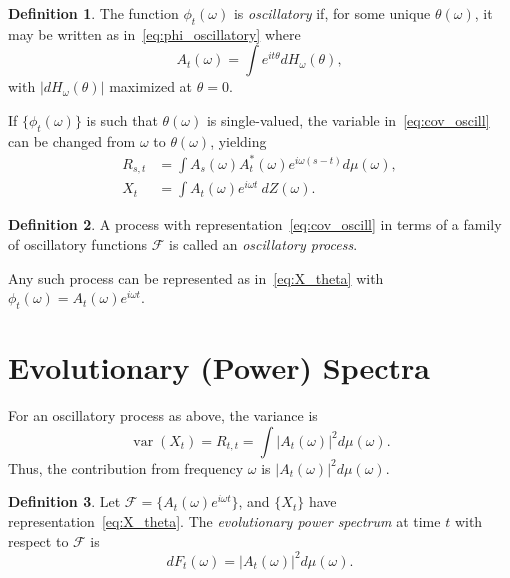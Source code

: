 \documentclass[12pt]{article}
\theoremstyle{definition}
\newtheorem{definition}{Definition}[section]
\theoremstyle{plain}
\theoremstyle{remark}
\begin{document}
\begin{definition}
\label{def:oscillatory_function}
The function $\phi_t(\omega)$ is \emph{oscillatory} if, for some unique $\theta(\omega)$, it may be written as in~\eqref{eq:phi_oscillatory} where
\begin{equation}
A_t(\omega) = \int e^{it\theta} dH_\omega(\theta),
\label{eq:A_FT}
\end{equation}
with $|dH_\omega(\theta)|$ maximized at $\theta=0$.
\end{definition}

If $\{\phi_t(\omega)\}$ is such that $\theta(\omega)$ is single-valued, the variable in~\eqref{eq:cov_oscill} can be changed from $\omega$ to $\theta(\omega)$, yielding
\begin{align}
R_{s,t} &= \int A_s(\omega) A_t^*(\omega) e^{i\omega(s-t)} d\mu(\omega),\label{eq:cov_theta}\\
X_t &= \int A_t(\omega) e^{i\omega t}\ dZ(\omega).\label{eq:X_theta}
\end{align}

\begin{definition}
\label{def:oscillatory_process}
A process with representation~\eqref{eq:cov_oscill} in terms of a family of oscillatory functions $\mathcal{F}$ is called an \emph{oscillatory process}.
\end{definition}

Any such process can be represented as in~\eqref{eq:X_theta} with $\phi_t(\omega) = A_t(\omega) e^{i\omega t}$.

\section{Evolutionary (Power) Spectra}
\label{sec:evospectra}

For an oscillatory process as above, the variance is
\begin{equation}
\operatorname{var}(X_t) = R_{t,t} = \int |A_t(\omega)|^2 d\mu(\omega).
\label{eq:var_xt}
\end{equation}
Thus, the contribution from frequency $\omega$ is $|A_t(\omega)|^2 d\mu(\omega)$.

\begin{definition}
\label{def:evolutionary_spectrum}
Let $\mathcal{F} = \{A_t(\omega) e^{i\omega t}\}$, and $\{X_t\}$ have representation~\eqref{eq:X_theta}. The \emph{evolutionary power spectrum} at time $t$ with respect to $\mathcal{F}$ is
\begin{equation}
dF_t(\omega) = |A_t(\omega)|^2 d\mu(\omega).
\label{eq:evolutionary_spectrum}
\end{equation}
\end{definition}
\end{document}

